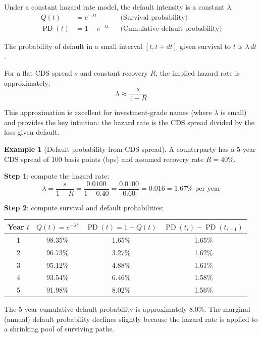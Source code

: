 \documentclass[11pt, a4paper]{article}
\theoremstyle{definition}
\newtheorem{example}{Example}[section]
\theoremstyle{plain}
\theoremstyle{remark}
\newcommand{\PD}{\operatorname{PD}}
\begin{document}
Under a constant hazard rate model, the default intensity is a constant $\lambda$:
\begin{align}
    Q(t) &= e^{-\lambda t} && \text{(Survival probability)} \label{eq:survival}\\
    \PD(t) &= 1 - e^{-\lambda t} && \text{(Cumulative default probability)} \label{eq:pd}
\end{align}

The probability of default in a small interval $[t, t + dt]$ given survival to $t$
is $\lambda\, dt$.

For a flat CDS spread $s$ and constant recovery $R$, the implied hazard rate is
approximately:
\begin{equation}\label{eq:hazard-approx}
    \lambda \approx \frac{s}{1 - R}
\end{equation}

This approximation is excellent for investment-grade names (where $\lambda$ is small)
and provides the key intuition: the hazard rate is the CDS spread divided by the
loss given default.

\begin{example}[Default probability from CDS spread]\label{ex:cds-bootstrap}
A counterparty has a 5-year CDS spread of 100 basis points (bps) and
assumed recovery rate $R = 40\%$.

\textbf{Step 1}: compute the hazard rate:
\[
    \lambda = \frac{s}{1 - R} = \frac{0.0100}{1 - 0.40} = \frac{0.0100}{0.60} = 0.01\overline{6} = 1.67\% \text{ per year}
\]

\textbf{Step 2}: compute survival and default probabilities:
\begin{center}
\begin{tabular}{@{}cccc@{}}
\toprule
\textbf{Year} $t$ & $Q(t) = e^{-\lambda t}$ & $\PD(t) = 1 - Q(t)$ & $\PD(t_i) - \PD(t_{i-1})$ \\
\midrule
1 & 98.35\% & 1.65\% & 1.65\% \\
2 & 96.73\% & 3.27\% & 1.62\% \\
3 & 95.12\% & 4.88\% & 1.61\% \\
4 & 93.54\% & 6.46\% & 1.58\% \\
5 & 91.98\% & 8.02\% & 1.56\% \\
\bottomrule
\end{tabular}
\end{center}

The 5-year cumulative default probability is approximately 8.0\%.
The marginal (annual) default probability declines slightly because the hazard rate
is applied to a shrinking pool of surviving paths.
\end{example}
\end{document}
